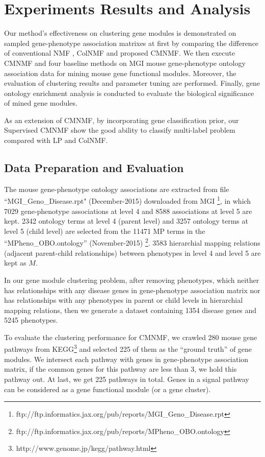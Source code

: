 \documentclass{bmcart}
\begin{document}
\section*{Experiments Results and Analysis}
Our method's effectiveness on clustering gene modules is demonstrated on sampled gene-phenotype association matrixes at first by comparing the difference of conventional NMF , ColNMF and proposed CMNMF. We then execute CMNMF and four baseline methods on MGI mouse gene-phenotype ontology association data for mining mouse gene functional modules. Moreover, the evaluation of clustering results and parameter tuning are performed. Finally, gene ontology enrichment analysis is conducted to evaluate the biological significance of mined gene modules.

As an extension of CMNMF, by incorporating gene classification prior, our Supervised CMNMF show the good ability to classify multi-label problem compared with LP and ColNMF.
\subsection*{\textbf{Data Preparation and Evaluation}}
 The mouse gene-phenotype ontology associations are extracted from file ``MGI\_Geno\_Disease.rpt" (December-2015) downloaded from MGI \footnote{ftp://ftp.informatics.jax.org/pub/reports/MGI\_Geno\_Disease.rpt}, in which 7029 gene-phenotype associations at level 4 and 8588 associations at level 5 are kept. 2342 ontology terms at level 4 (parent level) and 3257 ontology terms at level 5 (child level)  are selected from the 11471 MP terms in the ``MPheno\_OBO.ontology'' (November-2015) \footnote{ftp://ftp.informatics.jax.org/pub/reports/MPheno\_OBO.ontology}. 3583 hierarchial mapping relations (adjacent parent-child relationships) between phenotypes in level 4 and level 5 are kept as $M$.

In our gene module clustering problem,
after removing phenotypes, which neither has relationships with any disease genes in gene-phenotype association matrix nor has relationships with any phenotypes in parent or child levels in hierarchial mapping relations, then we generate a dataset containing 1354 disease genes and 5245 phenotypes.

To evaluate the clustering performance for CMNMF, we crawled 280 mouse gene pathways from KEGG\footnote{http://www.genome.jp/kegg/pathway.html} and selected 225 of them as the ``ground truth'' of gene modules. We intersect each pathway with genes in gene-phenotype association matrix, if the common genes for this pathway are less than 3, we hold this pathway out. At last, we get 225 pathways in total. Genes in a signal pathway can be considered as a gene functional module (or a gene cluster).
\end{document}
